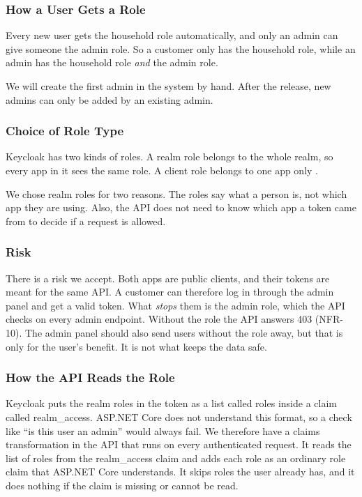 \documentclass[a4paper,11pt]{article}
\begin{document}
\subsubsection{How a User Gets a Role}
Every new user gets the household role automatically, and only an admin can give someone the admin role. So a customer only has the household role, while an admin has the household role \textit{and} the admin role.

We will create the first admin in the system by hand. After the release, new admins can only be added by an existing admin.

\subsubsection{Choice of Role Type}
Keycloak has two kinds of roles. A realm role belongs to the whole realm, so every app in it sees the same role. A client role belongs to one app only \cite{keycloak-server-admin-guide}.

We chose realm roles for two reasons. The roles say what a person is, not which app they are using. Also, the API does not need to know which app a token came from to decide if a request is allowed.

\subsubsection{Risk}
There is a risk we accept. Both apps are public clients, and their tokens are meant for the same API. A customer can therefore log in through the admin panel and get a valid token. What \textit{stops} them is the admin role, which the API checks on every admin endpoint. Without the role the API answers 403 (NFR-10). The admin panel should also send users without the role away, but that is only for the user's benefit. It is not what keeps the data safe.

\subsubsection{How the API Reads the Role}
Keycloak puts the realm roles in the token as a list called roles inside a claim called realm\_access. ASP.NET Core does not understand this format, so a check like ``is this user an admin'' would always fail. We therefore have a claims transformation in the API that runs on every authenticated request. It reads the list of roles from the realm\_access claim and adds each role as an ordinary role claim that ASP.NET Core understands. It skips roles the user already has, and it does nothing if the claim is missing or cannot be read.
\end{document}
